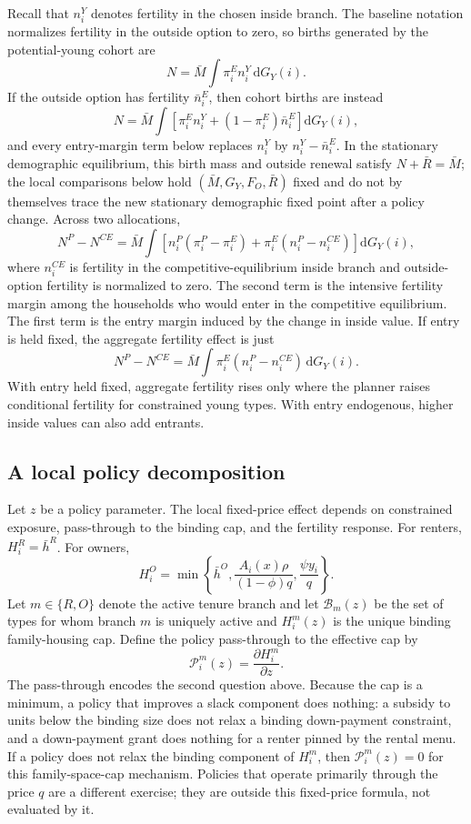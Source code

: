 \documentclass[11pt]{article}
\newcommand{\dd}{\mathrm d}
\newcommand{\1}{\mathbf 1}
\begin{document}
Recall that $n_i^Y$ denotes fertility in the chosen inside branch. The baseline notation normalizes fertility in the outside option to zero, so births generated by the potential-young cohort are
\[
N
=
\bar M\int \pi_i^E n_i^Y\,\dd G_Y(i).
\]
If the outside option has fertility $\bar n_i^E$, then cohort births are instead
\[
N
=
\bar M\int
\left[
\pi_i^E n_i^Y+(1-\pi_i^E)\bar n_i^E
\right]\dd G_Y(i),
\]
and every entry-margin term below replaces $n_i^Y$ by $n_i^Y-\bar n_i^E$. In the stationary demographic equilibrium, this birth mass and outside renewal satisfy $N+\bar R=\bar M$; the local comparisons below hold $(\bar M,G_Y,F_O,\bar R)$ fixed and do not by themselves trace the new stationary demographic fixed point after a policy change.
Across two allocations,
\[
N^P-N^{CE}
=
\bar M\int
\left[
n_i^P(\pi_i^P-\pi_i^E)
+
\pi_i^E(n_i^P-n_i^{CE})
\right]\dd G_Y(i),
\]
where \(n_i^{CE}\) is fertility in the competitive-equilibrium inside branch and outside-option fertility is normalized to zero. The second term is the intensive fertility margin among the households who would enter in the competitive equilibrium. The first term is the entry margin induced by the change in inside value. If entry is held fixed, the aggregate fertility effect is just
\[
N^P-N^{CE}
=
\bar M\int
\pi_i^E(n_i^P-n_i^{CE})\,\dd G_Y(i).
\]
With entry held fixed, aggregate fertility rises only where the planner raises conditional fertility for constrained young types. With entry endogenous, higher inside values can also add entrants.

\subsection{A local policy decomposition}

Let $z$ be a policy parameter. The local fixed-price effect depends on constrained exposure, pass-through to the binding cap, and the fertility response. For renters, $H_i^R=\bar h^R$. For owners,
\[
H_i^O
=
\min\left\{
\bar h^O,
\frac{A_i(x)\rho}{(1-\phi)q},
\frac{\psi y_i}{q}
\right\}.
\]
Let $m\in\{R,O\}$ denote the active tenure branch and let $\mathcal B_m(z)$ be the set of types for whom branch $m$ is uniquely active and $H_i^m(z)$ is the unique binding family-housing cap. Define the policy pass-through to the effective cap by
\[
\mathcal P_i^m(z)=\frac{\partial H_i^m}{\partial z}.
\]
The pass-through encodes the second question above. Because the cap is a minimum, a policy that improves a slack component does nothing: a subsidy to units below the binding size does not relax a binding down-payment constraint, and a down-payment grant does nothing for a renter pinned by the rental menu. If a policy does not relax the binding component of $H_i^m$, then $\mathcal P_i^m(z)=0$ for this family-space-cap mechanism. Policies that operate primarily through the price $q$ are a different exercise; they are outside this fixed-price formula, not evaluated by it.
\end{document}
